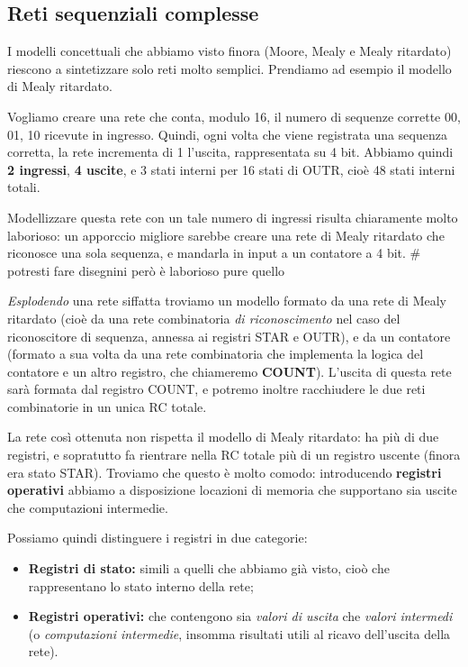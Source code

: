 \documentclass[a4paper,11pt]{article}
\begin{document}
\subsection{Reti sequenziali complesse}
I modelli concettuali che abbiamo visto finora (Moore, Mealy e Mealy ritardato) riescono a sintetizzare solo reti molto semplici.
Prendiamo ad esempio il modello di Mealy ritardato.

Vogliamo creare una rete che conta, modulo 16, il numero di sequenze corrette 00, 01, 10 ricevute in ingresso.
Quindi, ogni volta che viene registrata una sequenza corretta, la rete incrementa di 1 l'uscita, rappresentata su 4 bit.
Abbiamo quindi \textbf{2 ingressi}, \textbf{4 uscite}, e 3 stati interni per 16 stati di OUTR, cioè 48 stati interni totali.

Modellizzare questa rete con un tale numero di ingressi risulta chiaramente molto laborioso: un apporccio migliore sarebbe creare una rete di Mealy ritardato che riconosce una sola sequenza, e mandarla in input a un contatore a 4 bit.
# potresti fare disegnini però è laborioso pure quello

\textit{Esplodendo} una rete siffatta troviamo un modello formato da una rete di Mealy ritardato (cioè da una rete combinatoria \textit{di riconoscimento} nel caso del riconoscitore di sequenza, annessa ai registri STAR e OUTR), e da un contatore (formato a sua volta da una rete combinatoria che implementa la logica del contatore e un altro registro, che chiameremo \textbf{COUNT}).
L'uscita di questa rete sarà formata dal registro COUNT, e potremo inoltre racchiudere le due reti combinatorie in un unica RC totale.

La rete così ottenuta non rispetta il modello di Mealy ritardato: ha più di due registri, e sopratutto fa rientrare nella RC totale più di un registro uscente (finora era stato STAR).
Troviamo che questo è molto comodo: introducendo \textbf{registri operativi} abbiamo a disposizione locazioni di memoria che supportano sia uscite che computazioni intermedie.

Possiamo quindi distinguere i registri in due categorie:
\begin{itemize}
	\item \textbf{Registri di stato:} simili a quelli che abbiamo già visto, cioò che rappresentano lo stato interno della rete;
	\item \textbf{Registri operativi:} che contengono sia \textit{valori di uscita} che \textit{valori intermedi} (o \textit{computazioni intermedie}, insomma risultati utili al ricavo dell'uscita della rete). 
\end{itemize}
\end{document}
